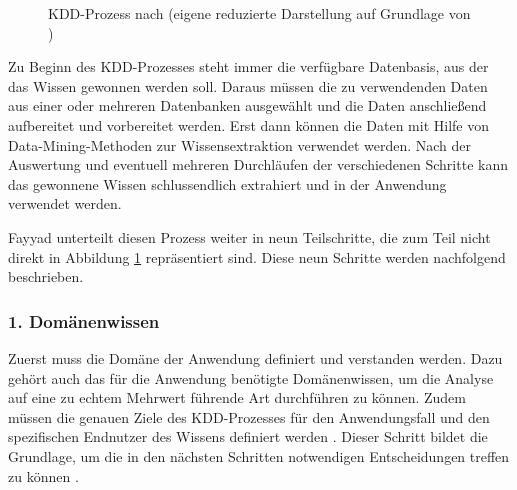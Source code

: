 \begin{figure}[H]
\begin{center}
		\caption{KDD-Prozess nach \cite{Fayyad:1996} (eigene reduzierte Darstellung auf Grundlage von \cite{Fayyad:1996})} 
\label{KDDFayyad}
\end{center}
\end{figure}


    


Zu Beginn des KDD-Prozesses steht immer die verfügbare Datenbasis, aus der das Wissen gewonnen werden soll. Daraus müssen die zu verwendenden Daten aus einer oder mehreren Datenbanken ausgewählt und die Daten anschließend aufbereitet und vorbereitet werden. Erst dann können die Daten mit Hilfe von Data-Mining-Methoden zur Wissensextraktion verwendet werden. Nach der Auswertung und eventuell mehreren Durchläufen der verschiedenen Schritte kann das gewonnene Wissen schlussendlich extrahiert und in der Anwendung verwendet werden.

Fayyad unterteilt diesen Prozess weiter in neun Teilschritte, die zum Teil nicht direkt in Abbildung \ref{KDDFayyad} repräsentiert sind. Diese neun Schritte werden nachfolgend beschrieben.

\subsubsection{1. Domänenwissen} %

Zuerst muss die Domäne der Anwendung definiert und verstanden werden. Dazu gehört auch das für die Anwendung benötigte Domänenwissen, um die Analyse auf eine zu echtem Mehrwert führende Art durchführen zu können. Zudem müssen die genauen Ziele des KDD-Prozesses für den Anwendungsfall und den spezifischen Endnutzer des Wissens definiert werden \cite{Fayyad:1996,Kurgan:2006}. Dieser Schritt bildet die Grundlage, um die in den nächsten 
Schritten notwendigen Entscheidungen treffen zu können \cite{Maimon:2010}.

